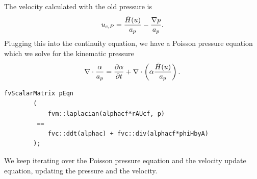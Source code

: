 

The velocity calculated with the old pressure is
\begin{equation}
    u_{c,P} =  \dfrac{\tilde{H}(u)}{a_p} -\dfrac{\nabla p}{a_p} .
\end{equation}
Plugging this into the continuity equation, we have a Poisson pressure equation which we solve for the kinematic pressure
\begin{equation}
    \nabla \cdot \dfrac{\alpha }{a_p} = \dfrac{\partial \alpha}{\partial t} + \nabla \cdot \left(\alpha \dfrac{\tilde{H}(u)}{a_p}\right).
\end{equation}

\ifkeepcode
\begin{lstlisting}[caption=\texttt{pEqn.C},label = {code:pEq}]
    fvScalarMatrix pEqn
        (
            fvm::laplacian(alphacf*rAUcf, p)
         ==
            fvc::ddt(alphac) + fvc::div(alphacf*phiHbyA)
        );
\end{lstlisting}
\fi

We keep iterating over the Poisson pressure equation and the velocity update equation, updating the pressure and the velocity.


